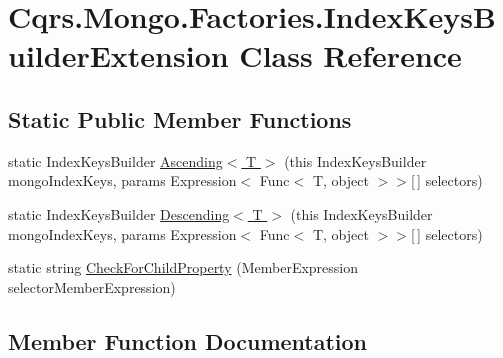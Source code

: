 \hypertarget{classCqrs_1_1Mongo_1_1Factories_1_1IndexKeysBuilderExtension}{}\section{Cqrs.\+Mongo.\+Factories.\+Index\+Keys\+Builder\+Extension Class Reference}
\label{classCqrs_1_1Mongo_1_1Factories_1_1IndexKeysBuilderExtension}
\subsection*{Static Public Member Functions}
\begin{DoxyCompactItemize}
\item 
static Index\+Keys\+Builder \hyperlink{classCqrs_1_1Mongo_1_1Factories_1_1IndexKeysBuilderExtension_a7c8f1f6e1477161509f8e9ac3ba1d8d9}{Ascending$<$ T $>$} (this Index\+Keys\+Builder mongo\+Index\+Keys, params Expression$<$ Func$<$ T, object $>$$>$\mbox{[}$\,$\mbox{]} selectors)
\item 
static Index\+Keys\+Builder \hyperlink{classCqrs_1_1Mongo_1_1Factories_1_1IndexKeysBuilderExtension_a9b2a712a921c4b5aea720a56eecb7643}{Descending$<$ T $>$} (this Index\+Keys\+Builder mongo\+Index\+Keys, params Expression$<$ Func$<$ T, object $>$$>$\mbox{[}$\,$\mbox{]} selectors)
\item 
static string \hyperlink{classCqrs_1_1Mongo_1_1Factories_1_1IndexKeysBuilderExtension_ab380ab44ca3970fb1e5a4c40e429b444}{Check\+For\+Child\+Property} (Member\+Expression selector\+Member\+Expression)
\end{DoxyCompactItemize}


\subsection{Member Function Documentation}
\mbox{\label{classCqrs_1_1Mongo_1_1Factories_1_1IndexKeysBuilderExtension_a7c8f1f6e1477161509f8e9ac3ba1d8d9}} 
